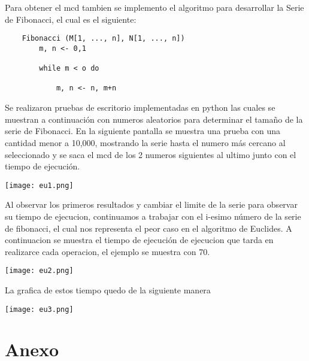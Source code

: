 \documentclass[12pt,twoside]{article}
\begin{document}
Para obtener el mcd tambien se implemento el algoritmo para desarrollar la Serie de Fibonacci, el cual es el siguiente:
\begin{lstlisting}
    Fibonacci (M[1, ..., n], N[1, ..., n])
        m, n <- 0,1
        
        while m < o do
        
            m, n <- n, m+n
\end{lstlisting}
Se realizaron pruebas de escritorio implementadas en python las cuales se muestran a continuación con numeros aleatorios para determinar el tamaño de la serie de Fibonacci. 
En la siguiente pantalla se muestra una prueba con una cantidad menor a 10,000, mostrando la serie hasta el numero más cercano al seleccionado y se saca el mcd de los 2 numeros siguientes al ultimo junto con el tiempo de ejecución.
\begin{center}
    \texttt{[image: eu1.png]}
\end{center}
Al observar los primeros resultados y cambiar el limite de la serie para observar su tiempo de ejecucion, continuamos 
a trabajar con el i-esimo número de la serie de fibonacci, el cual nos representa el peor caso en el algoritmo de Euclides. A continuacion se muestra el tiempo de ejecución de ejecucion que tarda en realizarce cada operacion, el ejemplo se muestra con 70.
\begin{center}
    \texttt{[image: eu2.png]}
\end{center}
La grafica de estos tiempo quedo de la siguiente manera 
\begin{center}
    \texttt{[image: eu3.png]}
\end{center}
\section{Anexo}
\end{document}
